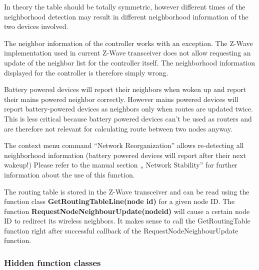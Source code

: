 In theory the table should be totally symmetric, however different times of the neighborhood detection may result in different neighborhood information of the 
two devices involved.
 
The neighbor information of the controller works with an exception. The Z-Wave implementation used in current Z-Wave transceiver does not allow requesting an 
update of the neighbor list for the controller itself. The neighborhood information displayed for the controller is therefore simply wrong.

Battery powered devices will report their neighbors when woken up and report their mains powered neighbor correctly. However mains powered devices will report 
battery-powered devices as neighbors only when routes are updated twice. This is less critical because battery powered devices can’t be used as routers and are 
therefore not relevant for calculating route between two nodes anyway. 
 
The context menu command “Network Reorganization” allows re-detecting all neighborhood information (battery powered devices will report after their next wakeup!) 
Please refer to the manual section „ Network Stability” for further information about the use of this function.



The routing table is stored in the Z-Wave transceiver and can be read using the function class {\bf  GetRoutingTableLine(node id)} for a given node ID. The function 
{\bf RequestNodeNeighbourUpdate(nodeid)} will cause a certain node ID to redirect its wireless neighbors. It makes sense to call the GetRoutingTable function right 
after successful callback of the RequestNodeNeighbourUpdate function. 

\subsubsection{Hidden function classes}

